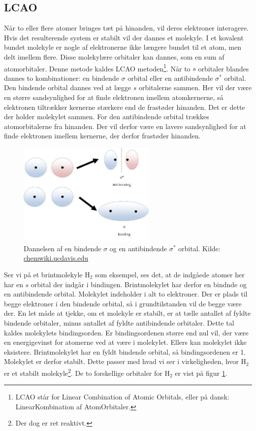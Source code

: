 \documentclass[../../Atom-ogMolekylefysik.tex]{subfiles}
\begin{document}
\subsection{LCAO}
Når to eller flere atomer bringes tæt på hinanden, vil deres elektroner interagere. Hvis det resulterende system er stabilt vil der dannes et molekyle. I et kovalent bundet molekyle er nogle af elektronerne ikke længere bundet til et atom, men delt imellem flere. Disse molekylære orbitaler kan dannes, som en sum af atomorbitaler. Denne metode kaldes LCAO metoden\footnote{LCAO står for Linear Combination of Atomic Orbitals, eller på dansk: LinearKombination af AtomOrbitaler.}.
Når to $s$ orbitaler blandes dannes to kombinationer: en bindende $\sigma$ orbital eller en antibindende $\sigma^*$ orbital. Den bindende orbital dannes ved at lægge $s$ orbitalerne sammen. Her vil der være en større sandsynlighed for at finde elektronen imellem atomkernerne, så elektronen tiltrækker kernerne stærkere end de frastøder hinanden. Det er dette der holder molekylet sammen.
For den antibindende orbital trækkes atomorbitalerne fra hinanden. Der vil derfor være en lavere sandsynlighed for at finde elektronen imellem kernerne, der derfor frastøder hinanden.
\begin{figure}[h!]
    \centering
    \includegraphics[width = 0.6\textwidth]{Atom-ogMolekylefysik/billeder/sigmaOrbital.jpg}
    \caption{Dannelsen af en bindende $\sigma$ og en antibindende $\sigma^*$ orbital.
    Kilde: \url{chemwiki.ucdavis.edu}}
    \label{fig:sigmaOrbital}
\end{figure}
Ser vi på et brintmolekyle H$_2$ som eksempel, ses det, at de indgåede atomer her har en $s$ orbital der indgår i bindingen. Brintmolekylet har derfor en bindnde og en antibindende orbital.
Molekylet indeholder i alt to elektroner. Der er plads til begge elektroner i den bindende orbital, så i grundtilstanden vil de begge være der. En let måde at tjekke, om et molekyle er stabilt, er at tælle antallet af fyldte bindende orbitaler, minus antallet af fyldte antibindende orbitaler. Dette tal kaldes molekylets bindingsorden. Er bindingsordenen større end nul vil, der være en energigevinst for atomerne ved at være i molekylet. Ellers kan molekylet ikke eksistere. Brintmolekylet har en fyldt bindende orbital, så bindingsordenen er 1. Molekylet er derfor stabilt. Dette passer med hvad vi ser i virkeligheden, hvor H$_2$ er et stabilt molekyle\footnote{Der dog er ret reaktivt.}. De to forskellige orbitaler for H$_2$ er vist på figur \ref{fig:sigmaOrbital}.  
\end{document}
